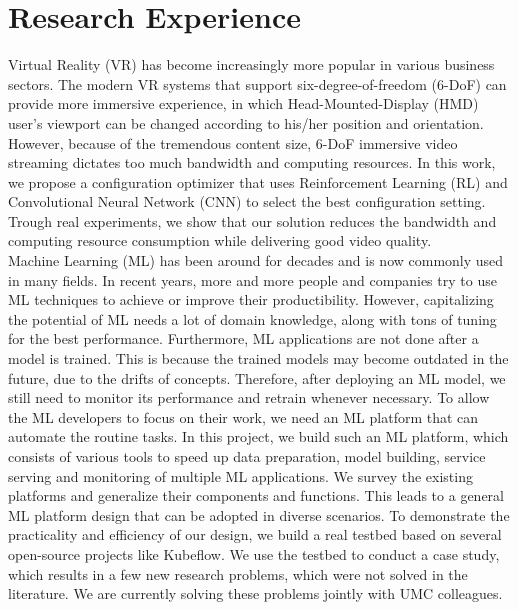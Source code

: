 \section{Research Experience}
{Virtual Reality (VR) has become increasingly more popular in various business sectors. 
The modern VR systems that support
six-degree-of-freedom (6-DoF) can provide more immersive experience, in which Head-Mounted-Display (HMD) user’s viewport can be changed
according to his/her position and orientation. However, because of the tremendous content size, 6-DoF immersive
video streaming dictates too much bandwidth and computing resources. In this work, we propose a configuration
optimizer that uses Reinforcement Learning (RL) and Convolutional Neural Network (CNN) to 
select the best configuration setting. Trough real experiments, we show that our solution reduces the bandwidth and computing resource consumption while delivering
good video quality.
} \\
{
Machine Learning (ML) has been around for decades
and is now commonly used in many fields. 
In recent years, more and more people and companies try to use ML techniques to achieve or improve their
productibility. However, capitalizing the potential of ML needs a lot of domain knowledge, along with tons of tuning for the best performance.
Furthermore, ML applications are not done after a model is trained. This is because the trained models may become outdated in the future, due to the drifts of concepts. 
Therefore, after deploying an ML model, we still need to monitor its performance and retrain whenever necessary.
To allow the ML developers to focus on their work, we need an ML platform that can automate the routine tasks.
In this project, we build such an ML platform, which consists of various tools to speed up data preparation, model building, service serving and monitoring of multiple ML applications.
We survey the existing platforms and generalize their components and functions.
This leads to a general ML platform design that can be adopted in diverse scenarios.
To demonstrate the practicality and efficiency of our design, we build a real testbed based on several open-source projects like Kubeflow.
We use the testbed to conduct a case study, which results in a few new research problems, which were not solved in the literature. We are currently solving these problems jointly with UMC colleagues. 
}\\
